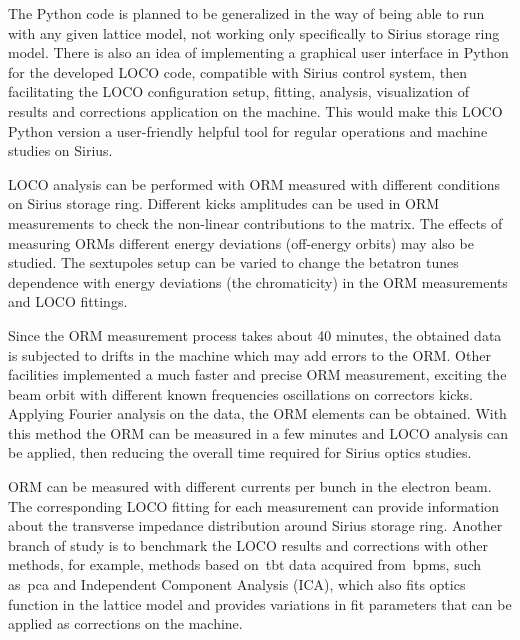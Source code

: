 The Python code is planned to be generalized in the way of being able to run with any given lattice model, not working only specifically to Sirius storage ring model. There is also an idea of implementing a graphical user interface in Python for the developed LOCO code, compatible with Sirius control system, then facilitating the LOCO configuration setup, fitting, analysis, visualization of results and corrections application on the machine. This would make this LOCO Python version a user-friendly helpful tool for regular operations and machine studies on Sirius. 

LOCO analysis can be performed with ORM measured with different conditions on Sirius storage ring. Different kicks amplitudes can be used in ORM measurements to check the non-linear contributions to the matrix. The effects of measuring ORMs different energy deviations (off-energy orbits) may also be studied. The sextupoles setup can be varied to change the betatron tunes dependence with energy deviations (the chromaticity) in the ORM measurements and LOCO fittings.

Since the ORM measurement process takes about 40 minutes, the obtained data is subjected to drifts in the machine which may add errors to the ORM. Other facilities implemented a much faster and precise ORM measurement, exciting the beam orbit with different known frequencies oscillations on correctors kicks. Applying Fourier analysis on the data, the ORM elements can be obtained. With this method the ORM can be measured in a few minutes and LOCO analysis can be applied, then reducing the overall time required for Sirius optics studies.

ORM can be measured with different currents per bunch in the electron beam. The corresponding LOCO fitting for each measurement can provide information about the transverse impedance distribution around Sirius storage ring.  
Another branch of study is to benchmark the LOCO results and corrections with other methods, for example, methods based on~\gls{tbt} data acquired from~\glspl{bpm}, such as~\gls{pca} and Independent Component Analysis (ICA), which also fits optics function in the lattice model and provides variations in fit parameters that can be applied as corrections on the machine.